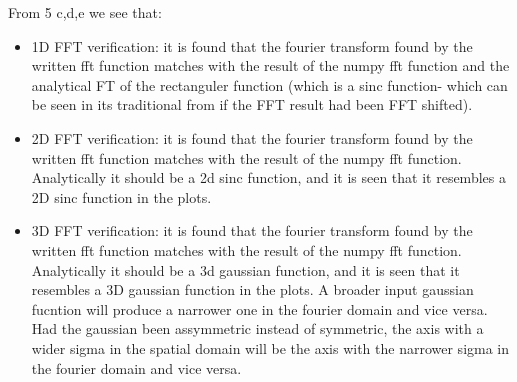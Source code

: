 From 5 c,d,e we see that:
\begin{itemize}
    \item 1D FFT verification: it is found that the fourier transform found by the written fft function matches with the result of the numpy fft function and the analytical FT of the rectanguler function (which is a sinc function- which can be seen in its traditional from if the FFT result had been FFT shifted).
    
    \item 2D FFT verification: it is found that the fourier transform found by the written fft function matches with the result of the numpy fft function. Analytically it should be a 2d sinc function, and it is seen that it resembles a 2D sinc function in the plots.
    
    \item 3D FFT verification: it is found that the fourier transform found by the written fft function matches with the result of the numpy fft function. Analytically it should be a 3d gaussian function, and it is seen that it resembles a 3D gaussian function in the plots. A broader input gaussian fucntion will produce a narrower one in the fourier domain and vice versa. Had the gaussian been assymmetric instead of symmetric, the axis with a wider sigma in the spatial domain will be the axis with the narrower sigma in the fourier domain and vice versa.
    
\end{itemize}